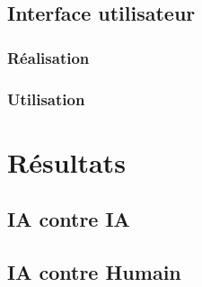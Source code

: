 \documentclass[article, backcover, french, nodocumentinfo]{upmethodology-document}
\begin{document}
		\subsection{Interface utilisateur}
			\subsubsection{Réalisation}
			\subsubsection{Utilisation}
	\section{Résultats}
		\subsection{IA contre IA}
		\subsection{IA contre Humain}
\end{document}
